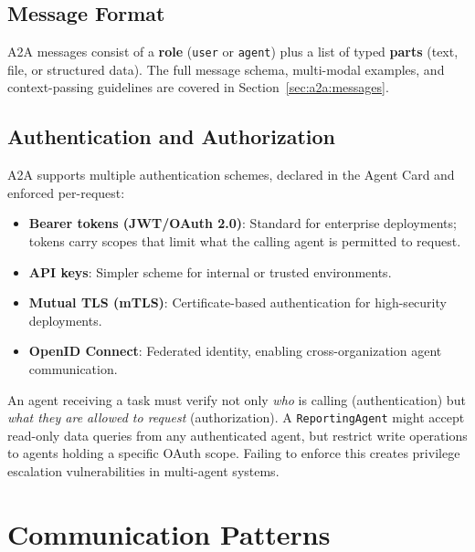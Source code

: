 \subsection{Message Format}
\label{message-format}

A2A messages consist of a \textbf{role} (\texttt{user} or \texttt{agent}) plus a list of typed \textbf{parts} (text, file, or structured data). The full message schema, multi-modal examples, and context-passing guidelines are covered in Section~\ref{sec:a2a:messages}.

\subsection{Authentication and Authorization}
\label{authentication-and-authorization}

A2A supports multiple authentication schemes, declared in the Agent Card and enforced per-request:

\begin{itemize}
  \item \textbf{Bearer tokens (JWT/OAuth 2.0)}: Standard for enterprise deployments; tokens carry scopes that limit what the calling agent is permitted to request.
  \item \textbf{API keys}: Simpler scheme for internal or trusted environments.
  \item \textbf{Mutual TLS (mTLS)}: Certificate-based authentication for high-security deployments.
  \item \textbf{OpenID Connect}: Federated identity, enabling cross-organization agent communication.
\end{itemize}

\begin{warningbox}
An agent receiving a task must verify not only \emph{who} is calling (authentication) but \emph{what they are allowed to request} (authorization). A \texttt{ReportingAgent} might accept read-only data queries from any authenticated agent, but restrict write operations to agents holding a specific OAuth scope. Failing to enforce this creates privilege escalation vulnerabilities in multi-agent systems.
\end{warningbox}

\section{Communication Patterns}
\label{sec:a2a:patterns}

